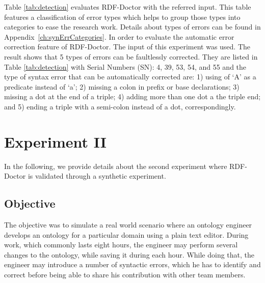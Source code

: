  Table \ref{tab:detection} evaluates RDF-Doctor with the referred input. This table features a classification of error types which helps to group those types into categories to ease the research work. Details about types of errors can be found in Appendix~\ref{ch:synErrCategories}. In order to evaluate the automatic error correction feature of RDF-Doctor. The input of this experiment was used. The result shows that 5 types of errors can be faultlessly corrected. They are listed in Table \ref{tab:detection} with Serial Numbers (SN): 4, 39, 53, 54, and 55 and the type of syntax error that can be automatically corrected are: 1) using of `A' as a predicate instead of `a'; 2) missing a colon in prefix or base declarations; 3) missing  a dot at the end of a triple; 4) adding more than one dot a the triple end; and 5) ending a triple with a semi-colon instead of a dot, correspondingly.       

\section{Experiment II}

In the following, we provide details about the second experiment where RDF-Doctor is validated through a synthetic experiment. 

\subsection{Objective}
The objective was to simulate a real world scenario where an ontology engineer develops an ontology for a particular domain using a plain text editor.
During work, which commonly lasts eight hours, the engineer may perform several changes to the ontology, while saving it during each hour.
While doing that, the engineer may introduce a number of syntactic errors, which he has to identify and correct before being able to share his contribution with other team members.

